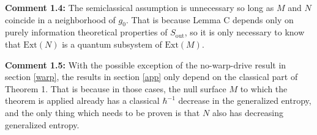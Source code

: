 \documentclass{article}
\begin{document}
\textbf{Comment 1.4:} The semiclassical assumption is unnecessary so long as $M$ and $N$ coincide in a neighborhood of $g_0$.  That is because Lemma C depends only on purely information theoretical properties of $S_\mathrm{out}$, so it is only necessary to know that 
$\mathrm{Ext}(N)$ is a quantum subsystem of $\mathrm{Ext}(M)$.

\textbf{Comment 1.5:} With the possible exception of the no-warp-drive result in section \ref{warp}, the results in section \ref{app} only depend on the classical part of Theorem 1.  That is because in those cases, the null surface $M$ to which the theorem is applied already has a classical $\hbar^{-1}$ decrease in the generalized entropy, and the only thing which needs to be proven is that $N$ also has decreasing generalized entropy.


\end{document}
